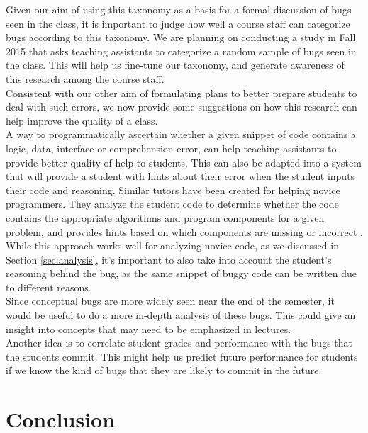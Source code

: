 \documentclass{sig-alternate}
\begin{document}
Given our aim of using this taxonomy as a basis for a formal discussion of bugs seen in the class, it is important to judge how well a course staff can categorize bugs according to this taxonomy. We are planning on conducting a study in Fall 2015 that asks teaching assistants to categorize a random sample of bugs seen in the class. This will help us fine-tune our taxonomy, and generate awareness of this research among the course staff.\\

Consistent with our other aim of formulating plans to better prepare students to deal with such errors, we now provide some suggestions on how this research can help improve the quality of a class.\\

A way to programmatically ascertain whether a given snippet of code contains a logic, data, interface or comprehension error, can help teaching assistants to provide better quality of help to students. This can also be adapted into a system that will provide a student with hints about their error when the student inputs their code and reasoning. Similar tutors have been created for helping novice programmers. They analyze the student code to determine whether the code contains the appropriate algorithms and program components for a given problem, and provides hints based on which components are missing or incorrect \cite{Sudol-DeLyser14}. While this approach works well for analyzing novice code, as we discussed in Section \ref{sec:analysis}, it's important to also take into account the student's reasoning behind the bug, as the same snippet of buggy code can be written due to different reasons.\\

Since conceptual bugs are more widely seen near the end of the semester, it would be useful to do a more in-depth analysis of these bugs. This could give an insight into concepts that may need to be emphasized in lectures.\\

Another idea is to correlate student grades and performance with the bugs that the students commit. This might help us predict future performance for students if we know the kind of bugs that they are likely to commit in the future.

\section{Conclusion}
\end{document}
